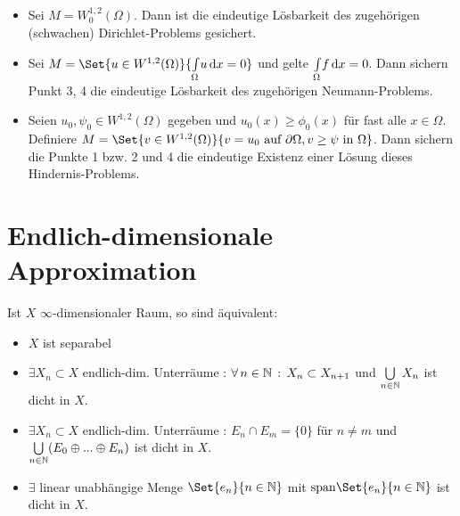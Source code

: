 \documentclass{cheat-sheet}
\begin{document}
\begin{bsp}
  \begin{itemize}
    \item Sei $M = W_0^{1,2}(\Omega)$. Dann ist die eindeutige Lösbarkeit des zugehörigen (schwachen) Dirichlet-Problems gesichert.
    \item Sei $M = \Set{ u \in W^{1,2}(\Omega) }{ \Int{\Omega}{}{u}{x} = 0 }$ und gelte ${\textstyle \int\limits_{\Omega}^{}} f \,\mathrm{d} x = 0$. Dann sichern Punkt 3, 4 die eindeutige Lösbarkeit des zugehörigen Neumann-Problems.
    \item Seien $u_0, \psi_0 \in W^{1,2}(\Omega)$ gegeben und $u_0(x) \geq \phi_0(x)$ für fast alle $x \in \Omega$. Definiere $M = \Set{ v \in W^{1,2}(\Omega) }{ v = u_0 \text{ auf } \partial \Omega, v \geq \psi \text{ in } \Omega }$. Dann sichern die Punkte 1 bzw. 2 und 4 die eindeutige Existenz einer Lösung dieses Hindernis-Problems.
  \end{itemize}
\end{bsp}


\section{Endlich-dimensionale Approximation}


\begin{lem}
  Ist $X$ $\infty$-dimensionaler Raum, so sind äquivalent:
  \begin{itemize}
    \item $X$ ist separabel
    \item $\exists X_n \subset X$ endlich-dim. Unterräume : $\forall \, {n \in \mathbb{N}} \,:\, X_n \subset X_{n{+}1}$ und $\bigcup_{n \in \N} X_n$ ist dicht in $X$.
    \item $\exists X_n \subset X$ endlich-dim. Unterräume : $E_n \cap E_m = \{ 0 \}$ für $n \not= m$ und $\bigcup_{n \in \N} (E_0 \oplus ... \oplus E_n)$ ist dicht in $X$.
    \item $\exists$ linear unabhängige Menge $\Set{ e_n }{ n \in \N }$ mit $\mathrm{span}\Set{e_n}{ n \in \N }$ ist dicht in $X$.
  \end{itemize}
\end{lem}

\end{document}

